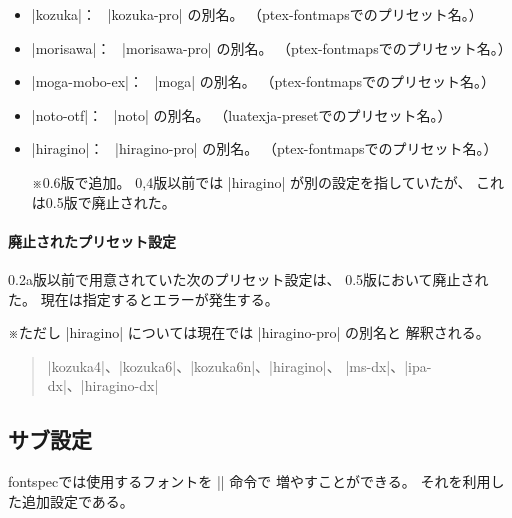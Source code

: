 \documentclass[xelatex,ja=standard,jafont=ipaex,
  a4paper]{bxjsarticle}
\newcommand{\Pkg}[1]{\textsf{#1}}
\newcommand{\Note}{\par\noindent ※}
\newcommand{\Means}{：\ }
\begin{document}
\begin{itemize}
\item |kozuka|\Means
  |kozuka-pro| の別名。
  （\Pkg{ptex-fontmaps}でのプリセット名。）
\item |morisawa|\Means
  |morisawa-pro| の別名。
  （\Pkg{ptex-fontmaps}でのプリセット名。）
\item |moga-mobo-ex|\Means
  |moga| の別名。
  （\Pkg{ptex-fontmaps}でのプリセット名。）
\item |noto-otf|\Means
  |noto| の別名。
  （\Pkg{luatexja-preset}でのプリセット名。）
\item |hiragino|\Means
  |hiragino-pro| の別名。
  （\Pkg{ptex-fontmaps}でのプリセット名。）
  \Note 0.6版で追加。
  0,4版以前では |hiragino| が別の設定を指していたが、
  これは0.5版で廃止された。
\end{itemize}

\paragraph{廃止されたプリセット設定}

0.2a版以前で用意されていた次のプリセット設定は、
0.5版において廃止された。
現在は指定するとエラーが発生する。

\Note ただし |hiragino| については現在では |hiragino-pro| の別名と
解釈される。

\begin{quote}
|kozuka4|、|kozuka6|、|kozuka6n|、|hiragino|、
|ms-dx|、|ipa-dx|、|hiragino-dx|
\end{quote}

\subsection{サブ設定}

\Pkg{fontspec}では使用するフォントを |\newfontfamily| 命令で
増やすことができる。
それを利用した追加設定である。
\end{document}
